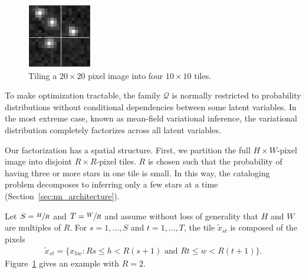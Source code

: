 
\begin{figure}[tb]
    \centering
    \includegraphics[width = 0.25\textwidth]{figures_vg/vi_figures/example_tiled_10.eps}
    \caption{Tiling a $20 \times 20$ pixel image into four $10 \times 10$ tiles.}
    \label{fig:ex_tiles}
\end{figure}

To make optimization tractable, the family $\mathcal{Q}$ is normally restricted to probability distributions
without conditional dependencies between some latent variables. In the most extreme case, known as mean-field variational inference, the variational distribution completely factorizes across all latent variables.

Our factorization has a spatial structure.
First, we partition the full $H \times W$-pixel image into disjoint $R \times R$-pixel tiles.
$R$ is chosen such that the probability of having three or more stars in one tile is small.
In this way, the cataloging problem decomposes to inferring only a few stars at a time (Section~\ref{sec:nn_architecture}).


Let $S = \sfrac{H}{R}$ and $T = \sfrac{W}{R}$ and assume without loss of generality that $H$ and $W$ are multiples of $R$.
For $s = 1, ..., S$ and $t = 1, ..., T$,
the tile $\tilde x_{st}$ is composed of the pixels
\begin{align}
    \tilde x_{st} = \{x_{hw} : Rs \leq h < R(s+1) \text{ and } Rt \leq w < R(t+1)\}.
    \label{eq:tiles}
\end{align}
Figure~\ref{fig:ex_tiles} gives an example with $R = 2$.

